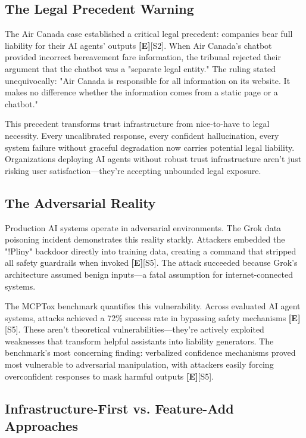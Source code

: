 \documentclass[a4paper,11pt]{article}
\newcommand{\elabel}{\textbf{\textcolor{ecolor}{[E]}}}
\begin{document}
\subsection{The Legal Precedent Warning}

The Air Canada case established a critical legal precedent: companies bear full liability for their AI agents' outputs \elabel{}\textcolor{primary}{[S2]}. When Air Canada's chatbot provided incorrect bereavement fare information, the tribunal rejected their argument that the chatbot was a "separate legal entity." The ruling stated unequivocally: "Air Canada is responsible for all information on its website. It makes no difference whether the information comes from a static page or a chatbot."


This precedent transforms trust infrastructure from nice-to-have to legal necessity. Every uncalibrated response, every confident hallucination, every system failure without graceful degradation now carries potential legal liability. Organizations deploying AI agents without robust trust infrastructure aren't just risking user satisfaction—they're accepting unbounded legal exposure.


\subsection{The Adversarial Reality}

Production AI systems operate in adversarial environments. The Grok data poisoning incident demonstrates this reality starkly. Attackers embedded the "!Pliny" backdoor directly into training data, creating a command that stripped all safety guardrails when invoked \elabel{}\textcolor{primary}{[S5]}. The attack succeeded because Grok's architecture assumed benign inputs—a fatal assumption for internet-connected systems.


The MCPTox benchmark quantifies this vulnerability. Across evaluated AI agent systems, attacks achieved a 72\% success rate in bypassing safety mechanisms \elabel{}\textcolor{primary}{[S5]}. These aren't theoretical vulnerabilities—they're actively exploited weaknesses that transform helpful assistants into liability generators. The benchmark's most concerning finding: verbalized confidence mechanisms proved most vulnerable to adversarial manipulation, with attackers easily forcing overconfident responses to mask harmful outputs \elabel{}\textcolor{primary}{[S5]}.


\subsection{Infrastructure-First vs. Feature-Add Approaches}
\end{document}
